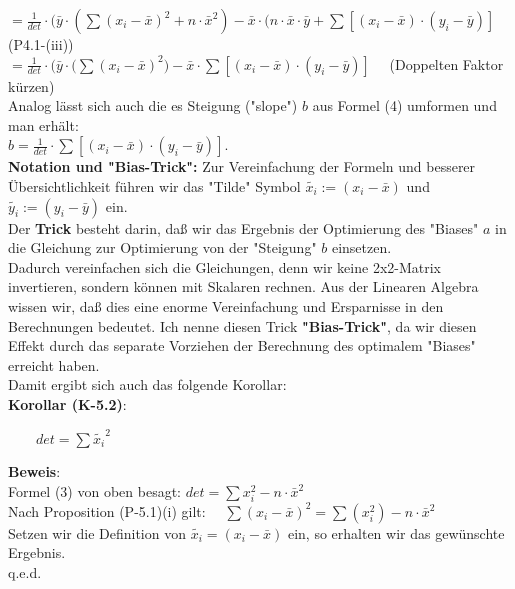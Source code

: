 \documentclass[12pt]{article}
\begin{document}
$ = \frac{1}{det} \cdot (\bar{y} \cdot (\sum{(x_i - \bar{x})^2} + n \cdot \bar{x}^2) - \bar{x} \cdot (n \cdot \bar{x} \cdot \bar{y} + \sum{[(x_i - \bar{x}) \cdot (y_i - \bar{y})]} $      (P4.1-(iii)) \\[0.2cm]
$ = \frac{1}{det} \cdot (\bar{y} \cdot (\sum{(x_i - \bar{x})^2)} - \bar{x} \cdot \sum{[(x_i - \bar{x}) \cdot (y_i - \bar{y})]} \quad $                                   (Doppelten Faktor kürzen)
\\[0.2cm]
Analog lässt sich auch die es Steigung ("slope") $b$ aus Formel (4) umformen und man erhält: \\[0.2cm]
$ b = \frac{1}{det} \cdot \sum{[(x_i - \bar{x}) \cdot (y_i - \bar{y})]}$.
\\[0.5cm]
%
\textbf{Notation und "Bias-Trick":} Zur Vereinfachung der Formeln und besserer Übersichtlichkeit führen wir das "Tilde" Symbol $ \widetilde{x_i} := (x_i - \bar{x}) $ und $ \widetilde{y_i} := (y_i - \bar{y}) $ ein.\\ 
Der \textbf{Trick} besteht darin, daß wir das Ergebnis der Optimierung des "Biases" $a$ in die Gleichung zur Optimierung von der "Steigung" $b$ einsetzen. \\
Dadurch vereinfachen sich die Gleichungen, denn wir keine 2x2-Matrix invertieren, sondern können mit Skalaren rechnen. Aus der Linearen Algebra wissen wir, daß dies eine enorme Vereinfachung und Ersparnisse in den Berechnungen bedeutet. Ich nenne diesen Trick \textbf{"Bias-Trick"}, da wir diesen Effekt durch das separate Vorziehen der Berechnung des optimalem "Biases" erreicht haben.\\[0.2cm] 
Damit ergibt sich auch das folgende Korollar: \\
\textbf{Korollar (K-5.2)}: 
\begin{center}
\begin{large}
 $ \qquad det = \sum{\widetilde{x_i}}^2 \qquad \qquad $ \\[0.2cm] 
\end{large}
\end{center}
%
\textbf{Beweis}:\\
Formel (3) von oben besagt: $ det = \sum{x_i^2} - n \cdot \bar{x}^2 $\\
Nach Proposition (P-5.1)(i) gilt: $ \quad \sum(x_i - \bar{x})^2 = \sum(x_i^2) - n \cdot \bar{x}^2 $\\[0.2cm] 
Setzen wir die Definition von $ \widetilde{x_i} = (x_i - \bar{x}) $ ein, so erhalten wir das gewünschte Ergebnis.\\
q.e.d.\\[0.5cm]
\end{document}
